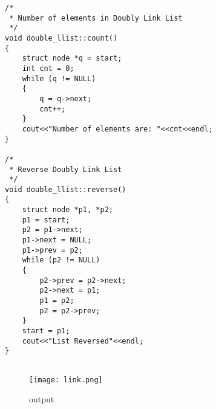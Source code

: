 \documentclass[11pt]{article}            %
\begin{document}
\begin{lstlisting}
/*
 * Number of elements in Doubly Link List
 */
void double_llist::count()
{ 	
    struct node *q = start;
    int cnt = 0;
    while (q != NULL)
    {
        q = q->next;
        cnt++;
    }
    cout<<"Number of elements are: "<<cnt<<endl;
}
 
/*
 * Reverse Doubly Link List
 */
void double_llist::reverse()
{
    struct node *p1, *p2;
    p1 = start;
    p2 = p1->next;
    p1->next = NULL;
    p1->prev = p2;
    while (p2 != NULL)
    {
        p2->prev = p2->next;
        p2->next = p1;
        p1 = p2;
        p2 = p2->prev; 
    }
    start = p1;
    cout<<"List Reversed"<<endl; 
}


\end{lstlisting}



\begin{figure*}
\centering
  \texttt{[image: link.png]}
\caption{output}
\label{Figure:3}    
\end{figure*} 

 
\end{document}
